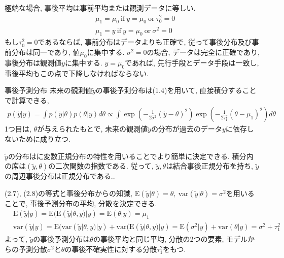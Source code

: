\documentclass[10pt,dvipdfmx,a4]{beamer}
\newcommand{\eqn}[1]{\begin{align*}#1\end{align*}}
\begin{document}

\begin{frame}
極端な場合, 事後平均は事前平均または観測データに等しい.
\eqn{&\mu_1=\mu_0\ \text{if}\ y=\mu_0\ \text{or}\ \tau_0^2=0\\
&\mu_1=y\ \text{if}\ y=\mu_0\ \text{or}\ \sigma^2=0}
もし$\tau_0^2=0$であるならば, 事前分布はデータよりも正確で, 従って事後分布及び事前分布は同一であり, 値$\mu_0$に集中する.
$\sigma^2=0$の場合, データは完全に正確であり, 事後分布は観測値$y$に集中する.
$y=\mu_0$であれば, 先行手段とデータ手段は一致し, 事後平均もこの点で下降しなければならない.
\end{frame}


\begin{frame}{事後予測分布}
未来の観測値$\tilde{y}$の事後予測分布は(1.4)を用いて, 直接積分することで計算できる,
\eqn{p(\tilde{y}|y)=\int p(\tilde{y}|\theta)p(\theta|y)d\theta \propto \int \exp \left(-\frac{1}{2\sigma^2}(\tilde{y}-\theta)^2\right) \exp \left(-\frac{1}{2\tau_1^2}(\theta-\mu_1)^2\right)d\theta}
1つ目は, $\theta$が与えられたもとで, 未来の観測値$\tilde{y}$の分布が過去のデータ$y$に依存しないために成り立つ.

$\tilde{y}$の分布はに変数正規分布の特性を用いることでより簡単に決定できる.
積分内の席は$(\tilde{y},\theta)$の二次関数の指数である.
従って, $\tilde{y}, \theta$は結合事後正規分布を持ち, $\tilde{y}$の周辺事後分布は正規分布である..

(2.7), (2.8)の等式と事後分布からの知識, $\text{E}(\tilde{y}|\theta)=\theta,\ \text{var}(\tilde{y}|\theta)=\sigma^2$を用いることで, 事後予測分布の平均, 分散を決定できる.
\eqn{&\text{E}(\tilde{y}|y)=\text{E}(\text{E}(\tilde{y}|\theta,y)|y)=\text{E}(\theta|y)=\mu_1\\
&\text{var}(\tilde{y}|y)=\text{E}(\text{var}(\tilde{y}|\theta,y)|y)+\text{var}(\text{E}(\tilde{y}|\theta,y)|y)=\text{E}(\sigma^2|y)+\text{var}(\theta|y)=\sigma^2+\tau_1^2}
よって, $\tilde{y}$の事後予測分布は$\theta$の事後平均と同じ平均, 分散の2つの要素, モデルからの予測分散$\sigma^2$と$\theta$の事後不確実性に対する分散$\tau_1^2$をもつ.
\end{frame}

\end{document}
